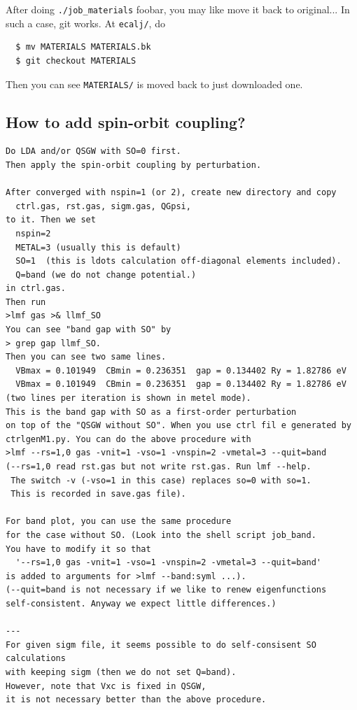 \documentclass[a4paper,10pt,epsf,fleqn]{article}
\begin{document}
After doing \verb+./job_materials+ foobar, you may like move it back to
original... In such a case, git works. At \verb+ecalj/+, do
\begin{verbatim}
  $ mv MATERIALS MATERIALS.bk
  $ git checkout MATERIALS
\end{verbatim}
Then you can see \verb+MATERIALS/+ is moved back to just downloaded one.



\subsection{How to add spin-orbit coupling?}
\begin{verbatim}
Do LDA and/or QSGW with SO=0 first.
Then apply the spin-orbit coupling by perturbation.

After converged with nspin=1 (or 2), create new directory and copy
  ctrl.gas, rst.gas, sigm.gas, QGpsi,
to it. Then we set
  nspin=2 
  METAL=3 (usually this is default)
  SO=1  (this is ldots calculation off-diagonal elements included).
  Q=band (we do not change potential.)
in ctrl.gas. 
Then run
>lmf gas >& llmf_SO
You can see "band gap with SO" by 
> grep gap llmf_SO.
Then you can see two same lines.
  VBmax = 0.101949  CBmin = 0.236351  gap = 0.134402 Ry = 1.82786 eV
  VBmax = 0.101949  CBmin = 0.236351  gap = 0.134402 Ry = 1.82786 eV
(two lines per iteration is shown in metel mode).
This is the band gap with SO as a first-order perturbation 
on top of the "QSGW without SO". When you use ctrl fil e generated by
ctrlgenM1.py. You can do the above procedure with
>lmf --rs=1,0 gas -vnit=1 -vso=1 -vnspin=2 -vmetal=3 --quit=band
(--rs=1,0 read rst.gas but not write rst.gas. Run lmf --help.
 The switch -v (-vso=1 in this case) replaces so=0 with so=1. 
 This is recorded in save.gas file).

For band plot, you can use the same procedure 
for the case without SO. (Look into the shell script job_band.
You have to modify it so that 
  '--rs=1,0 gas -vnit=1 -vso=1 -vnspin=2 -vmetal=3 --quit=band' 
is added to arguments for >lmf --band:syml ...).
(--quit=band is not necessary if we like to renew eigenfunctions
self-consistent. Anyway we expect little differences.)

---
For given sigm file, it seems possible to do self-consisent SO calculations
with keeping sigm (then we do not set Q=band). 
However, note that Vxc is fixed in QSGW, 
it is not necessary better than the above procedure.
\end{verbatim}
\end{document}
